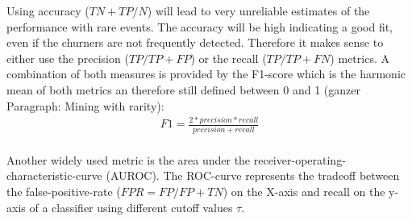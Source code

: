 \documentclass[12pt,titlepage]{article}
\begin{document}
Using accuracy ($TN+TP/N$) will lead to very unreliable estimates of the performance with rare events. The accuracy will be high indicating a good fit, even if the churners are not frequently detected. Therefore it makes sense to either use the precision ($TP/TP+FP$) or the recall ($TP/TP+FN$) metrics. A combination of both measures is provided by the F1-score which is the harmonic mean of both metrics an therefore still defined between 0 and 1 (ganzer Paragraph: Mining with rarity): \\

\begin{equation} \label{f1}
    \begin{aligned}
        F1 = \frac{2*precision*recall}{precision+recall} \\
    \end{aligned}
\end{equation}

Another widely used metric is the area under the receiver-operating-characteristic-curve (AUROC). The ROC-curve represents the tradeoff between the false-positive-rate ($FPR=FP/FP+TN$) on the X-axis and recall on the y-axis of a classifier using different cutoff values $\tau$. \\
\end{document}
